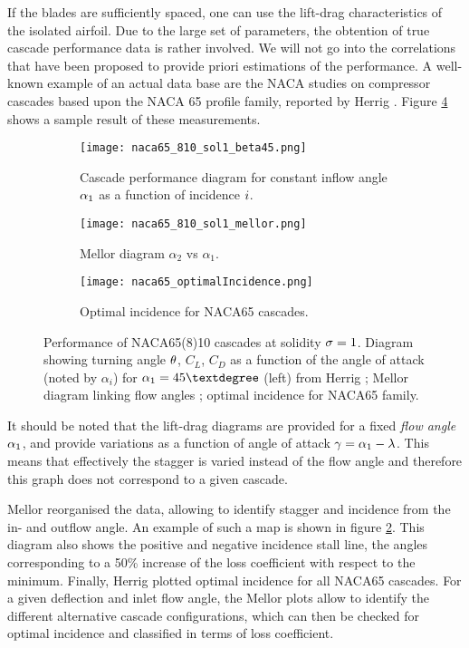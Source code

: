 If the blades are sufficiently spaced, one can use the lift-drag
characteristics of the isolated airfoil.  Due to the large set of
parameters, the obtention of true cascade performance data is rather
involved. We will not go into the correlations that have been proposed
to provide priori estimations of the performance. A well-known example
of an actual data base are the NACA studies on compressor cascades
based upon the NACA 65 profile family, reported by Herrig \etal
\cite{NACA-TN-3916}. Figure \ref{fig:naca65Perfo} shows a sample
result of these measurements.
\begin{figure}[!h]
  \centering
  \begin{subfigure}{0.52\textwidth}
    \texttt{[image: naca65\_810\_sol1\_beta45.png]}
    \caption{Cascade performance diagram for constant inflow angle
      $\alpha_1$ as a function of incidence $i$.}
    \label{fig:naca65Perfo_polar}
  \end{subfigure}
  \begin{subfigure}{0.47\textwidth}
    \texttt{[image: naca65\_810\_sol1\_mellor.png]}
    \caption{Mellor diagram $\alpha_2$ vs $\alpha_1$.}
    \label{fig:naca65Perfo_Mellor}
  \end{subfigure}
  \begin{subfigure}{0.47\textwidth}
    \texttt{[image: naca65\_optimalIncidence.png]}
    \caption{Optimal incidence for NACA65 cascades.}
    \label{fig:naca65Perfo_incidence}
  \end{subfigure}
  \caption{Performance of NACA65(8)10 cascades at solidity
    $\sigma=1$. Diagram showing turning angle $\theta$, $C_L$,
    $C_D$ as a function of the angle of attack (noted by $\alpha_i$)
    for $\aFlowAngle_1 = 45°$ (left) from Herrig \etal
    \cite{NACA-TN-3916}; Mellor diagram linking flow angles
    \cite{Mellor57}; optimal incidence for NACA65 family.}
  \label{fig:naca65Perfo}
\end{figure}
It should be noted that the lift-drag diagrams are provided for a
fixed \emph{flow angle} $\alpha_1$, and provide variations as a
function of angle of attack $\gamma = \alpha_1 -
\lambda$. This means that effectively the stagger is varied instead
of the flow angle and therefore this graph does not correspond to a
given cascade.

Mellor \cite{Mellor57} reorganised the data, allowing to identify
stagger and incidence from the in- and outflow angle. An example of
such a map is shown in figure \ref{fig:naca65Perfo_Mellor}. This diagram
also shows the positive and negative incidence stall line, \ie the
angles corresponding to a 50\% increase of the loss coefficient with
respect to the minimum. Finally, Herrig \etal plotted optimal
incidence for all NACA65 cascades. For a given deflection and inlet
flow angle, the Mellor plots allow to identify the different
alternative cascade configurations, which can then be checked for
optimal incidence and classified in terms of loss coefficient.

